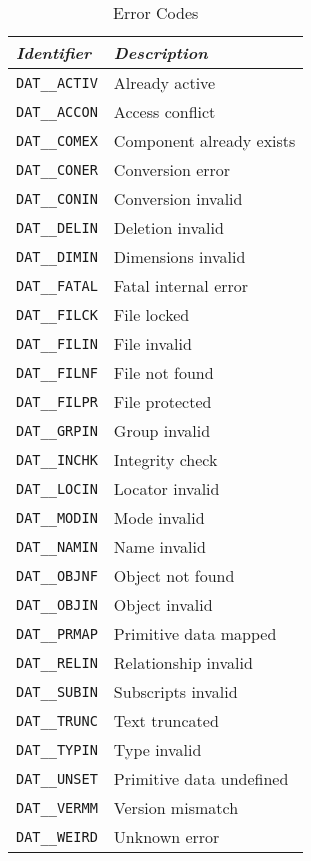 \begin {table}[htbp]
\begin {center}
\begin {tabular}{||l|l||}
\hline
{\em Identifier}	& {\em Description}\\
\hline
{\tt DAT\_\_ACTIV}	& Already active\\
{\tt DAT\_\_ACCON}	& Access conflict\\
{\tt DAT\_\_COMEX}	& Component already exists\\
{\tt DAT\_\_CONER}	& Conversion error\\
{\tt DAT\_\_CONIN}	& Conversion invalid\\
{\tt DAT\_\_DELIN}	& Deletion invalid\\
{\tt DAT\_\_DIMIN}	& Dimensions invalid\\
{\tt DAT\_\_FATAL}	& Fatal internal error\\
{\tt DAT\_\_FILCK}	& File locked\\
{\tt DAT\_\_FILIN}	& File invalid\\
{\tt DAT\_\_FILNF}	& File not found\\
{\tt DAT\_\_FILPR}	& File protected\\
{\tt DAT\_\_GRPIN}	& Group invalid\\
{\tt DAT\_\_INCHK}	& Integrity check\\
{\tt DAT\_\_LOCIN}	& Locator invalid\\
{\tt DAT\_\_MODIN}	& Mode invalid\\
{\tt DAT\_\_NAMIN}	& Name invalid\\
{\tt DAT\_\_OBJNF}	& Object not found\\
{\tt DAT\_\_OBJIN}	& Object invalid\\
{\tt DAT\_\_PRMAP}	& Primitive data mapped\\
{\tt DAT\_\_RELIN}	& Relationship invalid\\
{\tt DAT\_\_SUBIN}	& Subscripts invalid\\
{\tt DAT\_\_TRUNC}	& Text truncated\\
{\tt DAT\_\_TYPIN}	& Type invalid\\
{\tt DAT\_\_UNSET}	& Primitive data undefined\\
{\tt DAT\_\_VERMM}	& Version mismatch\\
{\tt DAT\_\_WEIRD}	& Unknown error\\
\hline
\end {tabular}
\caption {Error Codes}
\label {error_codes}
\end {center}
\end {table}

